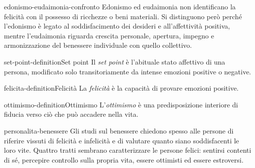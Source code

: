 \documentclass[preview]{standalone}
\begin{document}

\begin{snippet}{edonismo-eudaimonia-confronto}
    Edonismo ed eudaimonia non identificano la felicità con il possesso di
    ricchezze o beni materiali. Si distinguono però perché l'edonismo è legato
    al soddisfacimento dei desideri e all'affettività positiva, mentre
    l'eudaimonia riguarda crescita personale, apertura, impegno e armonizzazione
    del benessere individuale con quello collettivo.
\end{snippet}

\begin{snippetdefinition}{set-point-definition}{Set point}
    Il \emph{set point} è l'abituale stato affettivo di una persona, modificato
    solo transitoriamente da intense emozioni positive o negative.
\end{snippetdefinition}

\begin{snippetdefinition}{felicita-definition}{Felicità}
    La \emph{felicità} è la capacità di provare emozioni positive.
\end{snippetdefinition}

\begin{snippetdefinition}{ottimismo-definition}{Ottimismo}
    L'\emph{ottimismo} è una predisposizione interiore di fiducia verso ciò che
    può accadere nella vita.
\end{snippetdefinition}

\begin{snippet}{personalita-benessere}
    Gli studi sul benessere chiedono spesso alle persone di riferire vissuti di
    felicità e infelicità e di valutare quanto siano soddisfacenti le loro vite.
    Quattro tratti sembrano caratterizzare le persone felici: sentirsi contenti
    di sé, percepire controllo sulla propria vita, essere ottimisti ed essere
    estroversi.
\end{snippet}
\end{document}
